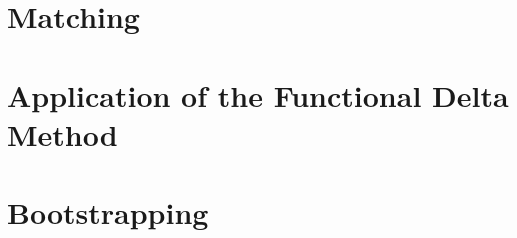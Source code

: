 \section{Matching}
  
\section{Application of the Functional Delta Method}
  
\section{Bootstrapping} 
  
